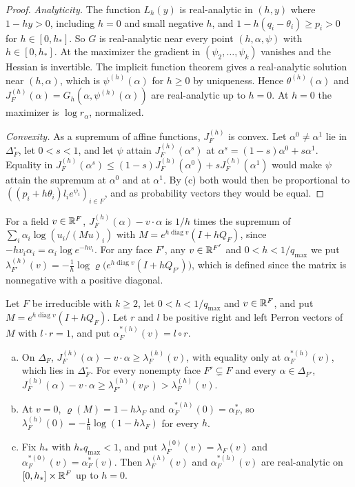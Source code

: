 \begin{proof}
\emph{Analyticity.} The function $L_h(y)$ is real-analytic in $(h,y)$ where
$1-hy>0$, including $h=0$ and small negative $h$, and $1-h(q_i-\theta_i)\ge p_i>0$
for $h\in[0,h_*]$. So $G$ is real-analytic near every point $(h,\alpha,\psi)$ with
$h\in[0,h_*]$. At the maximizer the gradient in $(\psi_2,\dots,\psi_k)$ vanishes
and the Hessian is invertible. The implicit function theorem gives a real-analytic
solution near $(h,\alpha)$, which is $\psi^{(h)}(\alpha)$ for $h\ge0$ by
uniqueness. Hence $\theta^{(h)}(\alpha)$ and
$J^{(h)}_F(\alpha)=G_h(\alpha,\psi^{(h)}(\alpha))$ are real-analytic up to
$h=0$. At $h=0$ the maximizer is $\log r_\alpha$, normalized.

\emph{Convexity.} As a supremum of affine functions, $J^{(h)}_F$ is convex. Let
$\alpha^0\ne\alpha^1$ lie in $\Delta_F^\circ$, let $0<s<1$, and let $\psi$ attain
$J^{(h)}_F(\alpha^s)$ at $\alpha^s=(1-s)\alpha^0+s\alpha^1$. Equality in
$J^{(h)}_F(\alpha^s)\le(1-s)J^{(h)}_F(\alpha^0)+sJ^{(h)}_F(\alpha^1)$ would make
$\psi$ attain the supremum at $\alpha^0$ and at $\alpha^1$. By (c) both would then
be proportional to $((p_i+h\theta_i)l_ie^{\psi_i})_{i\in F}$, and as probability
vectors they would be equal.
\end{proof}

For a field $v\in\mathbb{R}^F$, $J^{(h)}_F(\alpha)-v\cdot\alpha$ is $1/h$ times the
supremum of $\sum_i\alpha_i\log(u_i/(Mu)_i)$ with
$M=e^{h\operatorname{diag}v}(I+hQ_F)$, since $-hv_i\alpha_i=\alpha_i\log e^{-hv_i}$.
For any face $F'$, any $v\in\mathbb{R}^{F'}$ and $0<h<1/q_{\max}$ we put
$\lambda^{(h)}_{F'}(v)=-\frac1h\log\varrho\bigl(e^{h\operatorname{diag}v}(I+hQ_{F'})\bigr)$,
which is defined since the matrix is nonnegative with a positive diagonal.

\begin{proposition}\label{prop:discrete-variational}
Let $F$ be irreducible with $k\ge2$, let $0<h<1/q_{\max}$ and $v\in\mathbb{R}^F$, and
put $M=e^{h\operatorname{diag}v}(I+hQ_F)$. Let $r$ and $l$ be positive right and
left Perron vectors of $M$ with $l\cdot r=1$, and put
$\alpha^{*(h)}_F(v)=l\circ r$.
\begin{enumerate}[(a)]
\item On $\Delta_F$, $J^{(h)}_F(\alpha)-v\cdot\alpha\ge\lambda^{(h)}_F(v)$, with
equality only at $\alpha^{*(h)}_F(v)$, which lies in $\Delta_F^\circ$. For every
nonempty face $F'\subsetneq F$ and every $\alpha\in\Delta_{F'}$,
$J^{(h)}_F(\alpha)-v\cdot\alpha\ge\lambda^{(h)}_{F'}(v_{F'})>\lambda^{(h)}_F(v)$.
\item At $v=0$, $\varrho(M)=1-h\lambda_F$ and $\alpha^{*(h)}_F(0)=\alpha^*_F$, so
$\lambda^{(h)}_F(0)=-\frac1h\log(1-h\lambda_F)$ for every $h$.
\item Fix $h_*$ with $h_*q_{\max}<1$, and put $\lambda^{(0)}_F(v)=\lambda_F(v)$ and
$\alpha^{*(0)}_F(v)=\alpha^*_F(v)$. Then $\lambda^{(h)}_F(v)$ and
$\alpha^{*(h)}_F(v)$ are real-analytic on $[0,h_*]\times\mathbb{R}^F$ up to $h=0$.
\end{enumerate}
\end{proposition}

